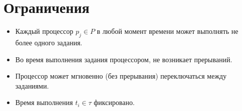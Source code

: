 \documentclass[openany, twoside, a4paper, 12pt]{extbook}
\begin{document}
\section*{Ограничения}

    \begin{itemize}
        \item Каждый процессор $p_j \in P$ в любой момент времени может выполнять не более одного задания.
        \item Во время выполнения задания процессором, не возникает прерываний.
        \item Процессор может мгновенно (без прерывания) переключаться между заданиями.

        \item Время выполнения $t_i \in \tau$ фиксировано.
    \end{itemize}
\newpage
\end{document}
